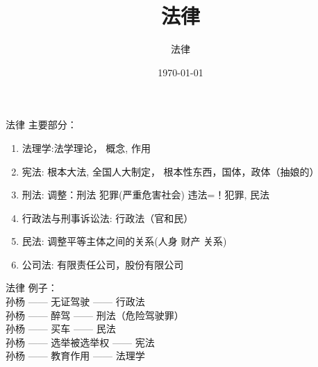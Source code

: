 \documentclass[aspectratio=169]{beamer}
\begin{document}
%
%

\title{法律}
\author{法律}
\date{\today}

\begin{frame}
\titlepage
\end{frame}

\begin{frame}[t]{法律}
    主要部分：\\
    \begin{enumerate}
        \item {法理学:法学理论， 概念, 作用}\\
        \item {宪法: 根本大法, 全国人大制定， 根本性东西，国体，政体（抽娘的）}\\
        \item {刑法: 调整：刑法 犯罪(严重危害社会) 违法=！犯罪, 民法 }\\
        \item {行政法与刑事诉讼法:  行政法（官和民）}\\
        \item {民法: 调整平等主体之间的关系(人身 财产 关系)}\\
        \item {公司法: 有限责任公司，股份有限公司}\\
    \end{enumerate}
\end{frame}

\begin{frame}[t]{法律}
    例子：\\
    孙杨 —— 无证驾驶 —— 行政法\\
    孙杨 —— 醉驾 —— 刑法（危险驾驶罪）\\
    孙杨 —— 买车 —— 民法\\
    孙杨 —— 选举被选举权 —— 宪法\\
    孙杨 —— 教育作用 —— 法理学\\

\end{frame}
\end{document}
